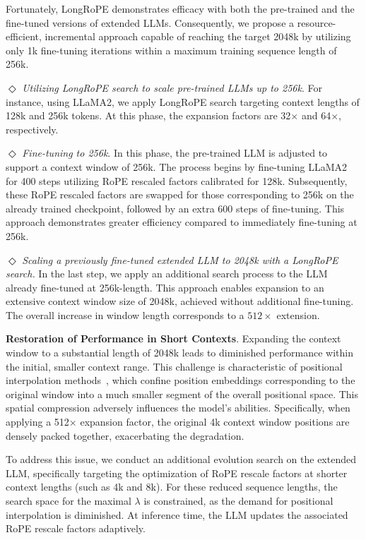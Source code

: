 Fortunately, LongRoPE demonstrates efficacy with both the pre-trained and the fine-tuned versions of extended LLMs. Consequently, we propose a resource-efficient, incremental approach capable of reaching the target 2048k by utilizing only 1k fine-tuning iterations within a maximum training sequence length of 256k.

$\Diamond$ \textit{Utilizing LongRoPE search to scale pre-trained LLMs up to 256k}. For instance, using LLaMA2, we apply LongRoPE search targeting context lengths of 128k and 256k tokens. At this phase, the expansion factors are 32$\times$ and 64$\times$, respectively.

$\Diamond$ \textit{Fine-tuning to 256k}. In this phase, the pre-trained LLM is adjusted to support a context window of 256k. The process begins by fine-tuning LLaMA2 for 400 steps utilizing RoPE rescaled factors calibrated for 128k. Subsequently, these RoPE rescaled factors are swapped for those corresponding to 256k on the already trained checkpoint, followed by an extra 600 steps of fine-tuning. This approach demonstrates greater efficiency compared to immediately fine-tuning at 256k.

$\Diamond$ \textit{Scaling a previously fine-tuned extended LLM to 2048k with a LongRoPE search.} In the last step, we apply an additional search process to the LLM already fine-tuned at 256k-length. This approach enables expansion to an extensive context window size of 2048k, achieved without additional fine-tuning. The overall increase in window length corresponds to a $512\times$ extension.

\textbf{Restoration of Performance in Short Contexts}.  Expanding the context window to a substantial length of 2048k leads to diminished performance within the initial, smaller context range. This challenge is characteristic of positional interpolation methods~\cite{pi}, which confine position embeddings corresponding to the original window into a much smaller segment of the overall positional space. This spatial compression adversely influences the model’s abilities. Specifically, when applying a 512$\times$ expansion factor, the original 4k context window positions are densely packed together, exacerbating the degradation.

To address this issue, we conduct an additional evolution search on the extended LLM, specifically targeting the optimization of RoPE rescale factors at shorter context lengths (such as 4k and 8k). For these reduced sequence lengths, the search space for the maximal $\lambda$ is constrained, as the demand for positional interpolation is diminished. At inference time, the LLM updates the associated RoPE rescale factors adaptively.

